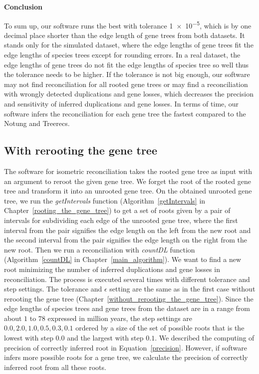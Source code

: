 \noindent \textbf{Conclusion}

To sum up, our software runs the best with tolerance \num {1e-5}, which is by one decimal place shorter than the edge length of gene trees from both datasets. It stands only for the simulated dataset, where the edge lengths of gene trees fit the edge lengths of species trees except for rounding errors. In a real dataset, the edge lengths of gene trees do not fit the edge lengths of species tree so well thus the tolerance needs to be higher. If the tolerance is not big enough, our software may not find reconciliation for all rooted gene trees or may find a reconciliation with wrongly detected duplications and gene losses, which decreases the precision and sensitivity of inferred duplications and gene losses. In terms of time, our software infers the reconciliation for each gene tree the fastest compared to the Notung and Treerecs.


\subsection{With rerooting the gene tree}

The software for isometric reconciliation takes the rooted gene tree as input with an argument to reroot the given gene tree. We forget the root of the rooted gene tree and transform it into an unrooted gene tree. On the obtained unrooted gene tree, we run the \emph{getIntervals} function (Algorithm~\ref{getIntervals} in Chapter~\ref{rooting_the_gene_tree}) to get a set of roots given by a pair of intervals for subdividing each edge of the unrooted gene tree, where the first interval from the pair signifies the edge length on the left from the new root and the second interval from the pair signifies the edge length on the right from the new root. Then we run a reconciliation with \emph{countDL} function (Algorithm~\ref{countDL} in Chapter~\ref{main_algorithm}). We want to find a new root minimizing the number of inferred duplications and gene losses in reconciliation. The process is executed several times with different tolerance and step settings. The tolerance and $\epsilon$ setting are the same as in the first case without rerooting the gene tree (Chapter~\ref{without_rerooting_the_gene_tree}). Since the edge lengths of species trees and gene trees from the dataset are in a range from about $1$ to $78$ expressed in million years, the step settings are $0.0, 2.0, 1.0, 0.5, 0.3, 0.1$ ordered by a size of the set of possible roots that is the lowest with step $0.0$ and the largest with step $0.1$. We described the computing of precision of correctly inferred root in Equation~\ref{precision}. However, if software infers more possible roots for a gene tree, we calculate the precision of correctly inferred root from all these roots.

